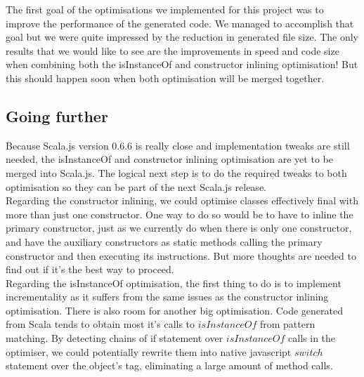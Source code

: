 The first goal of the optimisations we implemented for this project was to
improve the performance of the generated code. We managed to accomplish that
goal but we were quite impressed by the reduction in generated file size.
The only results that we would like to see are the improvements in speed and
code size when combining both the isInstanceOf and constructor inlining
optimisation! But this should happen soon when both optimisation will be merged
together.

\subsection{Going further}
Because Scala.js version 0.6.6 is really close and implementation
tweaks are still needed, the isInstanceOf and constructor inlining optimisation
are yet to be merged into Scala.js. The logical next step is to do the required
tweaks to both optimisation so they can be part of the next Scala.js release.\\
Regarding the constructor inlining, we could optimise classes effectively
final with more than just one constructor. One way to do so would be to have
to inline the primary constructor, just as we currently do when there is
only one constructor, and have the auxiliary constructors as static methods
calling the primary constructor and then executing its instructions. But more
thoughts are needed to find out if it's the best way to proceed.\\
Regarding the isInstanceOf optimisation, the first thing to do is to implement
incrementality as it suffers from the same issues as the constructor inlining
optimisation. There is also room for another big optimisation. Code generated
from Scala tends to obtain most it's calls to $isInstanceOf$ from pattern
matching. By detecting chains of if statement over $isInstanceOf$ calls in the
optimiser, we could potentially rewrite them into native javascript $switch$
statement over the object's tag, eliminating a large amount of method calls.
